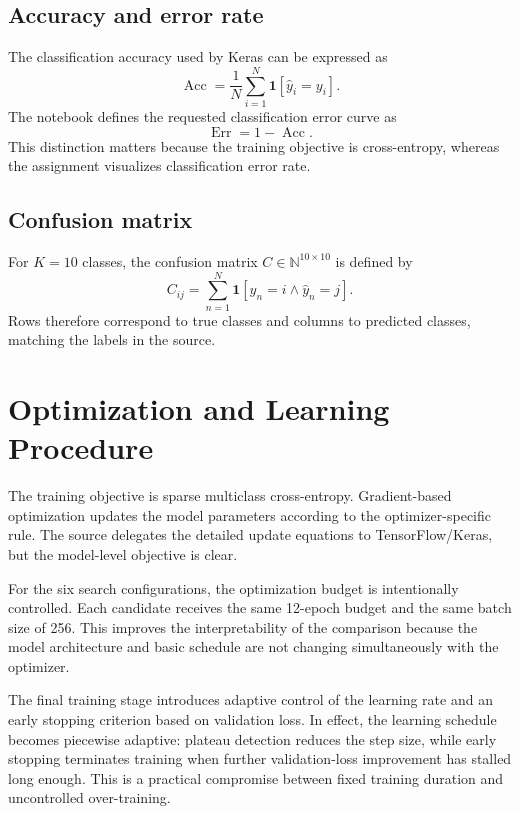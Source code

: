 \documentclass[11pt,a4paper]{article}
\begin{document}
\subsection{Accuracy and error rate}
The classification accuracy used by Keras can be expressed as
\begin{equation}
\operatorname{Acc}=\frac{1}{N}\sum_{i=1}^{N}\mathbf{1}[\hat{y}_i=y_i].
\end{equation}
The notebook defines the requested classification error curve as
\begin{equation}
\operatorname{Err}=1-\operatorname{Acc}.
\end{equation}
This distinction matters because the training objective is cross-entropy, whereas the assignment visualizes classification error rate.

\subsection{Confusion matrix}
For $K=10$ classes, the confusion matrix $C\in\mathbb{N}^{10\times10}$ is defined by
\begin{equation}
C_{ij}=\sum_{n=1}^{N}\mathbf{1}[y_n=i\land\hat{y}_n=j].
\end{equation}
Rows therefore correspond to true classes and columns to predicted classes, matching the labels in the source.

\section{Optimization and Learning Procedure}
The training objective is sparse multiclass cross-entropy. Gradient-based optimization updates the model parameters according to the optimizer-specific rule. The source delegates the detailed update equations to TensorFlow/Keras, but the model-level objective is clear.

For the six search configurations, the optimization budget is intentionally controlled. Each candidate receives the same 12-epoch budget and the same batch size of 256. This improves the interpretability of the comparison because the model architecture and basic schedule are not changing simultaneously with the optimizer.

The final training stage introduces adaptive control of the learning rate and an early stopping criterion based on validation loss. In effect, the learning schedule becomes piecewise adaptive: plateau detection reduces the step size, while early stopping terminates training when further validation-loss improvement has stalled long enough. This is a practical compromise between fixed training duration and uncontrolled over-training.
\end{document}
